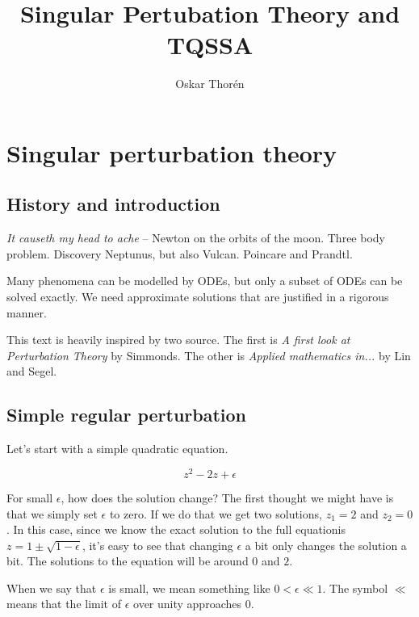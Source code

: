 \documentclass[12pt]{report}
\begin{document}


\title{Singular Pertubation Theory and TQSSA}
\author{Oskar Thor\'{e}n}

\maketitle

\chapter{Singular perturbation theory}

\section{History and introduction}

\textit{It causeth my head to ache} -- Newton on the orbits of the moon. Three
body problem. Discovery Neptunus, but also Vulcan. Poincare and Prandtl.

Many phenomena can be modelled by ODEs, but only a subset of ODEs can be solved
exactly. We need approximate solutions that are justified in a rigorous manner.

This text is heavily inspired by two source. The first is \textit{A first look
at Perturbation Theory} by Simmonds. The other is \textit{Applied mathematics
in...} by Lin and Segel.

\section{Simple regular perturbation}

Let's start with a simple quadratic equation.

\begin{equation}
  z^2 - 2z + \epsilon
\end{equation}


For small $\epsilon$, how does the solution change? The first thought we might
have is that we simply set $\epsilon$ to zero. If we do that we get two
solutions, $z_1 = 2$ and $z_2 = 0$. In this case, since we know the exact
solution to the full equationis $z = 1 \pm \sqrt{1-\epsilon}$, it's easy to see
that changing $\epsilon$ a bit only changes the solution a bit. The solutions to
the equation will be around $0$ and $2$.

When we say that $\epsilon$ is small, we mean something like $0 < \epsilon
\ll 1$. The symbol $\ll$ means that the limit of $\epsilon$ over unity
approaches $0$.
\end{document}
